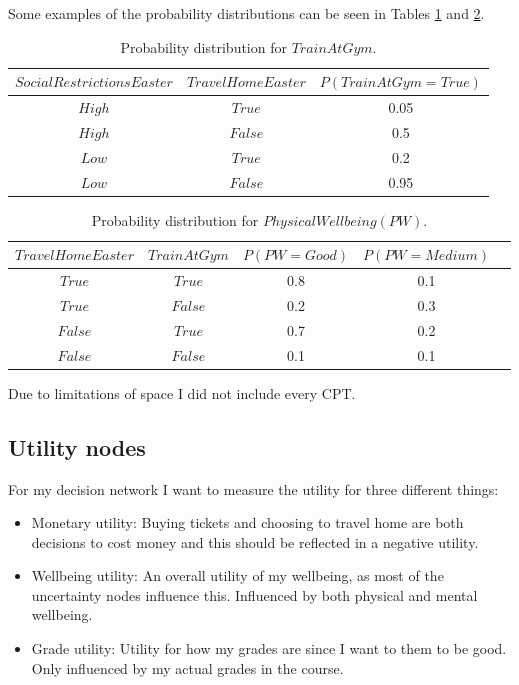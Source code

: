 \documentclass[11pt, a4paper, english]{../Template/NTNUoving}
\begin{document}
\begin{oppgave}
    Some examples of the probability distributions can be seen in Tables \ref{tab:TAG} and \ref{tab:PW}.

    \begin{table}[H]
        \begin{tabular}{|c|c|c|}
            \hline
            $SocialRestrictionsEaster$ & $TravelHomeEaster$ & $P(TrainAtGym=True)$ \\
            \hline
            $High$ & $True$ & 0.05  \\ [1.0ex]
            $High$ & $False$ & 0.5 \\ [1.0ex]
            $Low$ & $True$ & 0.2 \\ [1.0ex]
            $Low$ & $False$ & 0.95 \\ [1.0ex]
            \hline
    \end{tabular}
        \caption{Probability distribution for $TrainAtGym$.}
        \label{tab:TAG}
\end{table}

\begin{table}[H]
    \begin{tabular}{|c|c|c|c|c|}
        \hline
        $TravelHomeEaster$ & $TrainAtGym$ & $P(PW=Good)$ & $P(PW=Medium)$ \\
        \hline
        $True$ & $True$ & 0.8 & 0.1 \\ [1.0ex]
        $True$ & $False$ & 0.2 & 0.3 \\ [1.0ex]
        $False$ & $True$ & 0.7 & 0.2 \\ [1.0ex]
        $False$ & $False$ & 0.1 & 0.1 \\ [1.0ex]
        \hline
    \end{tabular}
    \caption{Probability distribution for $PhysicalWellbeing (PW)$.}
    \label{tab:PW}
\end{table}

Due to limitations of space I did not include every CPT.
    \subsection{Utility nodes}

    For my decision network I want to measure the utility for three different things:

    \begin{itemize}
        \item Monetary utility: Buying tickets and choosing to travel home are both decisions to cost money and this should be reflected in a negative utility.
        \item Wellbeing utility: An overall utility of my wellbeing, as most of the uncertainty nodes influence this. Influenced by both physical and mental wellbeing.
        \item Grade utility: Utility for how my grades are since I want to them to be good. Only influenced by my actual grades in the course.
    \end{itemize}


\end{oppgave}
\end{document}
